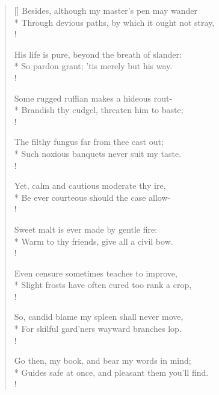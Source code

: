 \begin{verse}[\versewidth]
Besides, although my master's pen may wander\\*
Through devious paths, by which it ought not stray,\\!

His life is pure, beyond the breath of slander:\\*
So pardon grant; 'tis merely but his way.\\!

Some rugged ruffian makes a hideous rout-\\*
Brandish thy cudgel, threaten him to baste;\\!

The filthy fungus far from thee cast out;\\*
Such noxious banquets never suit my taste.\\!

Yet, calm and cautious moderate thy ire,\\*
Be ever courteous should the case allow-\\!

Sweet malt is ever made by gentle fire:\\*
Warm to thy friends, give all a civil bow.\\!

Even censure sometimes teaches to improve,\\*
Slight frosts have often cured too rank a crop,\\!

So, candid blame my spleen shall never move,\\*
For skilful gard'ners wayward branches lop.\\!

Go then, my book, and bear my words in mind;\\*
Guides safe at once, and pleasant them you'll find.\\!
\end{verse}
